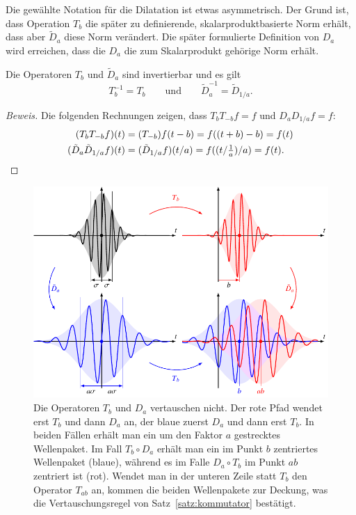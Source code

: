Die gewählte Notation für die Dilatation ist etwas asymmetrisch.
Der Grund ist, dass Operation $T_b$ die später zu definierende,
skalarproduktbasierte Norm erhält, dass aber $\tilde{D}_a$ diese Norm
verändert.
Die später formulierte Definition von $D_a$ wird erreichen, dass 
die $D_a$ die zum Skalarprodukt gehörige Norm erhält.

\begin{satz}
\label{geometrie:satz:inverse}
Die Operatoren $T_b$ und $\tilde{D}_a$ sind invertierbar und es gilt
\[
T_b^{-1} = T_b
\qquad\text{und}\qquad
\tilde{D}_a^{-1} = \tilde{D}_{1/a}.
\]
\end{satz}

\begin{proof}[Beweis]
Die folgenden Rechnungen zeigen, dass $T_bT_{-b}f=f$ und $D_aD_{1/a}f=f$:
\begin{align*}
(T_bT_{-b}f)(t)
&=
(T_{-b})f(t-b)
=
f((t+b)-b)
=
f(t)
\\
(\tilde{D}_a\tilde{D}_{1/a}f)(t)
&=
(\tilde{D}_{1/a}f)(t/a)
=
f((t/{\textstyle\frac1a})/a)
=
f(t).
\qedhere
\end{align*}
\end{proof}

\begin{figure}
\centering
\includegraphics[width=\hsize]{chapters/1-geometrie/images/kommutator.pdf}
\caption{Die Operatoren $T_b$ und $D_a$ vertauschen nicht.
Der rote Pfad wendet erst $T_b$ und dann $D_a$ an, der blaue zuerst
$D_a$ und dann erst $T_b$.
In beiden Fällen erhält man ein um den Faktor $a$ gestrecktes
Wellenpaket.
Im Fall $T_b\circ D_a$ erhält man ein im Punkt $b$ zentriertes Wellenpaket
(blaue), während es im Falle $D_a\circ T_b$ im Punkt $ab$ zentriert ist (rot).
Wendet man in der unteren Zeile statt $T_b$ den Operator $T_{ab}$ an, 
kommen die beiden Wellenpakete zur Deckung, was die Vertauschungsregel
von Satz~\ref{satz:kommutator} bestätigt.
\label{geometrie:kommutator:image}}
\end{figure}

